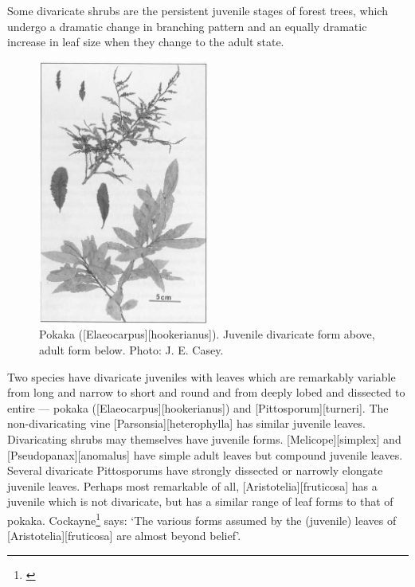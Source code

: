 Some divaricate shrubs are the persistent juvenile stages of forest trees, which undergo a dramatic change in branching pattern and an equally dramatic increase in leaf size when they change to the adult state.

\begin{figure}
	\includegraphics[width=0.5\textwidth]{graphics/figure78pokaka.jpg}
	\centering
	\caption[Pokaka]{Pokaka ([Elaeocarpus][hookerianus]).
	Juvenile divaricate form above, adult form below.
	Photo:  J. E. Casey.}%
	\label{fig:78pokaka}
\end{figure}

Two species have divaricate juveniles with leaves which are remarkably variable from long and narrow to short and round and from deeply lobed and dissected to entire --- pokaka ([Elaeocarpus][hookerianus]) and [Pittosporum][turneri].
The non-divaricating vine [Parsonsia][heterophylla] has similar juvenile leaves.
Divaricating shrubs may themselves have juvenile forms. [Melicope][simplex] and [Pseudopanax][anomalus] have simple adult leaves but compound juvenile leaves.
Several divaricate Pittosporums have strongly dissected or narrowly elongate juvenile leaves.
Perhaps most remarkable of all, [Aristotelia][fruticosa] has a juvenile which is not divaricate, but has a similar range of leaf forms to that of pokaka.
Cockayne\footnote{\cite{cockayne1899enquiry}} says: `The various forms assumed by the (juvenile) leaves of [Aristotelia][fruticosa] are almost beyond belief'.

